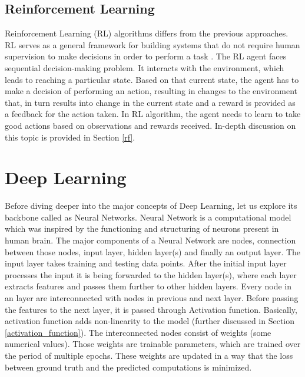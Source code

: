 \documentclass[en,]{template/rrlab}
\begin{document}
\subsection{Reinforcement Learning}
Reinforcement Learning (RL) algorithms differs from the previous approaches. RL serves as a general framework for building systems that do not require human supervision to make decisions in order to perform a task \cite{buffet2020reinforcement}. The RL agent faces sequential decision-making problem. It interacts with the environment, which leads to reaching a particular state. Based on that current state, the agent has to make a decision of performing an action, resulting in changes to the environment that, in turn results into change in the current state and a reward is provided as a feedback for the action taken. In RL algorithm, the agent needs to learn to take good actions based on observations and rewards received. In-depth discussion on this topic is provided in Section \ref{rf}.

\section{Deep Learning}
Before diving deeper into the major concepts of Deep Learning, let us explore its backbone called as Neural Networks. Neural Network is a computational model which was inspired by the functioning and structuring of neurons present in human brain. The major components of a Neural Network are nodes, connection between those nodes, input layer, hidden layer(s) and finally an output layer. The input layer takes training and testing data points. After the initial input layer processes the input it is being forwarded to the hidden layer(s), where each layer extracts features and passes them further to other hidden layers. Every node in an layer are interconnected with nodes in previous and next layer. Before passing the features to the next layer, it is passed through Activation function. Basically, activation function adds non-linearity to the model (further discussed in Section \ref{activation_function}). The interconnected nodes consist of weights (some numerical values). Those weights are trainable parameters, which are trained over the period of multiple epochs. These weights are updated in a way that the loss between ground truth and the predicted computations is minimized.
\end{document}
